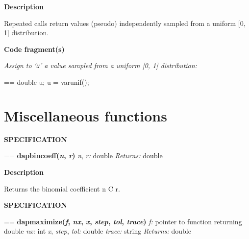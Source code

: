 \documentclass{book}
\makeatletter
\newcommand\Texinfocommandstyletextvar[1]{{\normalfont{}\textsl{#1}}}%
\newenvironment{Texinfopreformatted}{%
  \par\GNUTobeylines\obeyspaces\frenchspacing\parskip=\z@\parindent=\z@}{}
{\catcode`\^^M=13 \gdef\GNUTobeylines{\catcode`\^^M=13 \def^^M{\null\par}}}
\newenvironment{Texinfoindented}{\begin{list}{}{}\item\relax}{\end{list}}
\renewcommand{\_}{\Texinfounderscore\discretionary{}{}{}}
\makeatother
\begin{document}
\noindent{}\textbf{Description}

Repeated calls return values (pseudo) independently
sampled from a uniform [0, 1] distribution.

\noindent{}\textbf{Code fragment(s)}

\emph{Assign to `\texttt{u}' a value sampled from a uniform [0, 1] distribution:}
\begin{Texinfoindented}
\begin{Texinfopreformatted}%
\ttfamily double u;
u = varunif();
\end{Texinfopreformatted}
\end{Texinfoindented}

\section{{Miscellaneous functions}}
\label{anchor:Miscellaneous-functions}%

\noindent{}\textbf{SPECIFICATION}
\begin{Texinfoindented}
\begin{Texinfopreformatted}%
\textbf{dap\_bincoeff(\Texinfocommandstyletextvar{n}, \Texinfocommandstyletextvar{r})}
\Texinfocommandstyletextvar{n}, \Texinfocommandstyletextvar{r:} double
\Texinfocommandstyletextvar{Returns:} double
\end{Texinfopreformatted}
\end{Texinfoindented}
%
%
%

\noindent{}\textbf{Description}

Returns the binomial coefficient n C r.

\noindent{}\textbf{SPECIFICATION}
\begin{Texinfoindented}
\begin{Texinfopreformatted}%
\textbf{dap\_maximize(\Texinfocommandstyletextvar{f}, \Texinfocommandstyletextvar{nx}, \Texinfocommandstyletextvar{x}, \Texinfocommandstyletextvar{step}, \Texinfocommandstyletextvar{tol}, \Texinfocommandstyletextvar{trace})}
\Texinfocommandstyletextvar{f:} pointer to function returning double
\Texinfocommandstyletextvar{nx:} int
\Texinfocommandstyletextvar{x}, \Texinfocommandstyletextvar{step}, \Texinfocommandstyletextvar{tol:} double
\Texinfocommandstyletextvar{trace:} string
\Texinfocommandstyletextvar{Returns:} double
\end{Texinfopreformatted}
\end{Texinfoindented}
%
%
%
\end{document}
